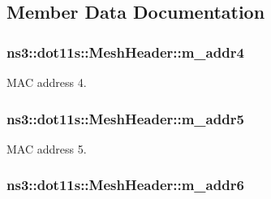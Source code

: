 \subsection{Member Data Documentation}
\subsubsection[{\texorpdfstring{m\+\_\+addr4}{m_addr4}}]{ ns3\+::dot11s\+::\+Mesh\+Header\+::m\+\_\+addr4\hspace{0.3cm}{\ttfamily [private]}}\hypertarget{classns3_1_1dot11s_1_1MeshHeader_a4d62d6b97bff6136314833200b747e17}{}\label{classns3_1_1dot11s_1_1MeshHeader_a4d62d6b97bff6136314833200b747e17}


M\+AC address 4. 

\subsubsection[{\texorpdfstring{m\+\_\+addr5}{m_addr5}}]{ ns3\+::dot11s\+::\+Mesh\+Header\+::m\+\_\+addr5\hspace{0.3cm}{\ttfamily [private]}}\hypertarget{classns3_1_1dot11s_1_1MeshHeader_aec4f70b8a26d0134c5b1239a88d0f542}{}\label{classns3_1_1dot11s_1_1MeshHeader_aec4f70b8a26d0134c5b1239a88d0f542}


M\+AC address 5. 

\subsubsection[{\texorpdfstring{m\+\_\+addr6}{m_addr6}}]{ ns3\+::dot11s\+::\+Mesh\+Header\+::m\+\_\+addr6\hspace{0.3cm}{\ttfamily [private]}}\hypertarget{classns3_1_1dot11s_1_1MeshHeader_a339b9fe0435cd04b204400e933d56fcc}{}\label{classns3_1_1dot11s_1_1MeshHeader_a339b9fe0435cd04b204400e933d56fcc}


